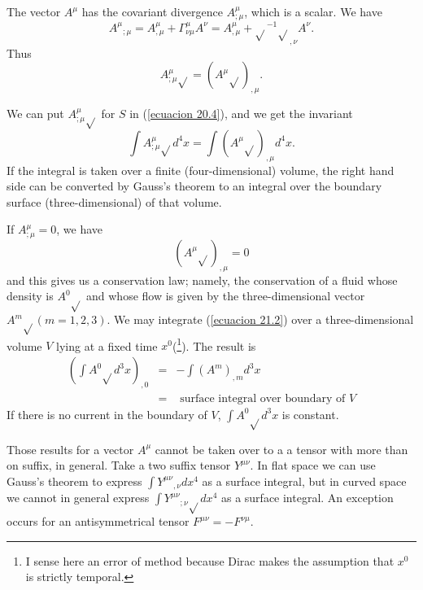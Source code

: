 The vector $A^\mu$ has the covariant divergence $A^\mu_{;\mu}$, which is a scalar. We have
\[
    {A^\mu}_{;\mu} = A^\mu_{,\mu} + \Gamma^\mu_{\nu\mu} A^\nu = A^\mu_{,\mu}+\sqrt{}^{-1}\sqrt{}_{,\nu}A^\nu.
\]
Thus
\begin{equation}
 \label{ecuacion 21.1}
 A^\mu_{;\mu} \sqrt{} = \left( A^\mu \sqrt{} \right)_{,\mu}.
\end{equation}

We can put $A^\mu_{;\mu}\sqrt{}$ for $S$ in (\ref{ecuacion 20.4}), and we get the invariant
\[
 \int {A^\mu_{;\mu}\sqrt{} d^4 x}
  = \int { \left(A^\mu \sqrt{}\right)_{,\mu} d^4 x}.
\]
If the integral is taken over a finite (four-dimensional) volume, the right hand side can be converted by Gauss's 
theorem to an integral over the boundary surface (three-dimensional) of that volume.

If $A^\mu_{;\mu}=0$, we have 
\begin{equation}
 \label{ecuacion 21.2}
 \left( A^\mu \sqrt{}\right)_{,\mu} = 0
\end{equation}
and this gives us a conservation law; namely, the conservation of a fluid whose density is $A^0\sqrt{}$ and whose flow 
is given by the three-dimensional vector $A^m\sqrt{}(m=1,2,3)$. We may integrate (\ref{ecuacion 21.2}) over a 
three-dimensional volume $V$ lying at a fixed time $x^0$(\footnote{I sense here an error of method because Dirac makes 
the assumption that $x^0$ is strictly temporal.}). The result is
\[
\begin{array}{rcl}
    \left(\int{A^0\sqrt{}d^3x}\right)_{,0} & = & - \int{\left(A^m\right)_{,m}d^3 x} \\
                               & = & \mbox{ surface integral over boundary of } V
\end{array} 
\]
If there is no current in the boundary of $V$, $\int{A^0\sqrt{}d^3x}$ is constant. 

Those results for a vector $A^\mu$ cannot be taken over to a a tensor with more than on suffix, in general. Take a two 
suffix tensor $Y^{\mu\nu}$. In flat space we can use Gauss's theorem to express $\int{{Y^{\mu\nu}}_{,\nu}dx^4}$ as a 
surface integral, but in curved space we cannot in general express $\int{{Y^{\mu\nu}}_{;\nu}\sqrt{}dx^4}$ as a surface 
integral. An exception occurs for an antisymmetrical tensor $F^{\mu\nu} = -F^{\nu\mu}$.


